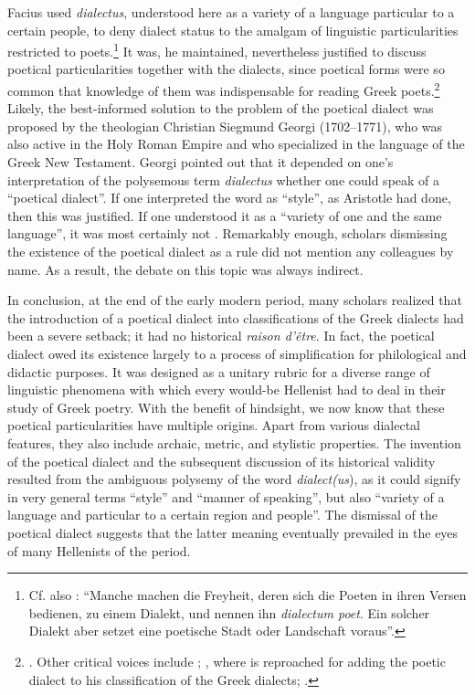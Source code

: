 {Facius used \textit{dialectus}, understood here as a variety of a language particular to a certain people, to deny dialect status to the amalgam of linguistic particularities restricted to poets.\footnote{Cf. also \citet[67]{Haas1780}: “Manche machen die Freyheit, deren sich die Poeten in ihren Versen bedienen, zu einem Dialekt, und nennen ihn \textit{dialectum poet}. Ein solcher Dialekt aber setzet eine poetische Stadt oder Landschaft voraus”.} It was, he maintained, nevertheless justified to discuss poetical particularities together with the dialects, since poetical forms were so common that knowledge of them was indispensable for reading Greek poets.\footnote{\citet[98]{Facius1782}. Other critical voices include \citet[\textsc{a.3}\textsc{\textsuperscript{v}}]{Bolius1689}; \citet[\textsc{d.2}\textsc{\textsuperscript{v}}]{Thryllitsch1709}, where \citet[147]{Reyher1634} is reproached for adding the poetic dialect to his classification of the Greek dialects; \citet[136--167]{Walch1772}.} Likely, the best-informed solution to the problem of the poetical dialect was proposed by the theologian Christian Siegmund Georgi (1702–1771), who was also active in the Holy Roman Empire and who specialized in the language of the Greek New Testament. Georgi pointed out that it depended on one’s interpretation of the polysemous term \textit{dialectus} whether one could speak of a “poetical dialect”. If one interpreted the word as “style”, as Aristotle had done, then this was justified. If one understood it as a “variety of one and the same language”, it was most certainly not \citep[169]{Georgi1733}. Remarkably enough, scholars dismissing the existence of the poetical dialect as a rule did not mention any colleagues by name. As a result, the debate on this topic was always indirect.

In conclusion, at the end of the early modern period, many scholars realized that the introduction of a poetical dialect into classifications of the Greek dialects had been a severe setback; it had no historical \textit{raison d’être}. In fact, the poetical dialect owed its existence largely to a process of simplification for philological and didactic purposes. It was designed as a unitary rubric for a diverse range of linguistic phenomena with which every would-be Hellenist had to deal in their study of Greek poetry. With the benefit of hindsight, we now know that these poetical particularities have multiple origins. Apart from various dialectal features, they also include archaic, metric, and stylistic properties. The invention of the poetical dialect and the subsequent discussion of its historical validity resulted from the ambiguous polysemy of the word \textit{dialect(us}), as it could signify in very general terms “style” and “manner of speaking”, but also “variety of a language and particular to a certain region and people”. The dismissal of the poetical dialect suggests that the latter meaning eventually prevailed in the eyes of many Hellenists of the period.

}
